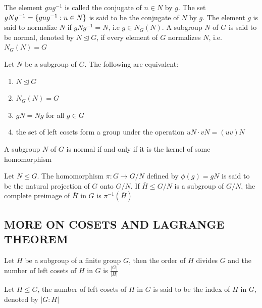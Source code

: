 \begin{definition}
	The element $gng^{-1}$ is called the conjugate of $n \in N$ by $g$. The set $gNg^{-1} = \{gng^{-1}: n \in N\}$ is said to be the conjugate of $N$ by $g$. The element $g$ is said to normalize $N$ if $gNg^{-1} = N$, i.e $g \in N_G(N)$. A subgroup $N$ of $G$ is said to be normal, denoted by $N \trianglelefteq G$, if every element of $G$ normalizes $N$, i.e. $N_G(N) = G$
\end{definition}

\begin{theorem}
	Let $N$ be a subgroup of $G$. The following are equivalent:
	\begin{enumerate}
		\item $N \trianglelefteq G$
		\item $N_G(N) = G$
		\item $gN = Ng$ for all $g \in G$
		\item the set of left cosets form a group under the operation $uN \cdot vN = (uv) N$
	\end{enumerate}
\end{theorem}

\begin{proposition}
	A subgroup $N$ of $G$ is normal if and only if it is the kernel of some homomorphism
\end{proposition}

\begin{definition}
	Let $N \trianglelefteq G$. The homomorphism $\pi: G \to G/N$ defined by $\phi(g) = gN$ is said to be the natural projection of $G$ onto $G/N$. If $\overline{H} \leq G/N$ is a subgroup of $G/N$, the complete preimage of $\overline{H}$ in $G$ is $\pi^{-1}(\overline{H})$
\end{definition}

\subsection{MORE ON COSETS AND LAGRANGE THEOREM}

\begin{theorem}
	Let $H$ be a subgroup of a finite group $G$, then the order of $H$ divides $G$ and the number of left cosets of $H$ in $G$ is $\frac{|G|}{|H|}$
\end{theorem}

\begin{definition}
	Let $H \leq G$, the number of left cosets of $H$ in $G$ is said to be the index of $H$ in $G$, denoted by $|G:H|$
\end{definition}

